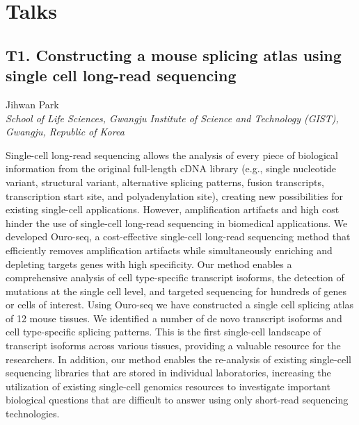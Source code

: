\chapter{Talks}

\section*{T1. Constructing a mouse splicing atlas using single cell long-read sequencing}

\begin{center}
Jihwan Park \\
\vspace{0.3cm}
\textit{School of Life Sciences, Gwangju Institute of Science and Technology (GIST), Gwangju, Republic of Korea} \\
\end{center}

\noindent
Single-cell long-read sequencing allows the analysis of every piece of biological information from the original full-length cDNA library (e.g., single nucleotide variant, structural variant, alternative splicing patterns, fusion transcripts, transcription start site, and polyadenylation site), creating new possibilities for existing single-cell applications. However, amplification artifacts and high cost hinder the use of single-cell long-read sequencing in biomedical applications. We developed Ouro-seq, a cost-effective single-cell long-read sequencing method that efficiently removes amplification artifacts while simultaneously enriching and depleting targets genes with high specificity. Our method enables a comprehensive analysis of cell type-specific transcript isoforms, the detection of mutations at the single cell level, and targeted sequencing for hundreds of genes or cells of interest. Using Ouro-seq we have constructed a single cell splicing atlas of 12 mouse tissues. We identified a number of de novo transcript isoforms and cell type-specific splicing patterns. This is the first single-cell landscape of transcript isoforms across various tissues, providing a valuable resource for the researchers. In addition, our method enables the re-analysis of existing single-cell sequencing libraries that are stored in individual laboratories, increasing the utilization of existing single-cell genomics resources to investigate important biological questions that are difficult to answer using only short-read sequencing technologies.
\newpage



